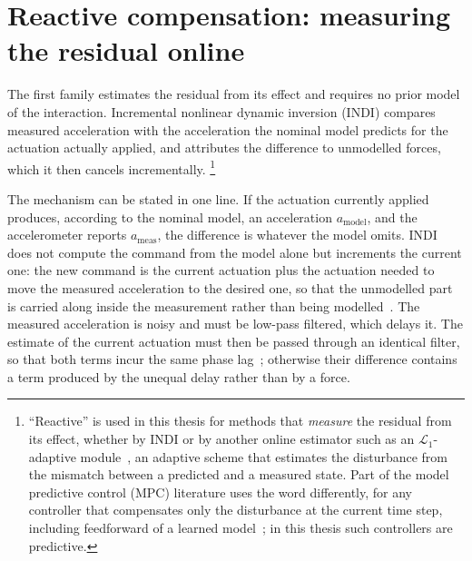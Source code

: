 \section{Reactive compensation: measuring the residual online}
\label{sec:rw-reactive}

The first family estimates the residual from its effect and requires no prior model of the
interaction. Incremental nonlinear dynamic inversion (INDI) compares measured acceleration with the
acceleration the nominal model predicts for the actuation actually applied, and attributes the
difference to unmodelled forces, which it then cancels incrementally.%
\footnote{``Reactive'' is used in this thesis for methods that \emph{measure} the residual from its
effect, whether by INDI or by another online estimator such as an $\mathcal{L}_1$-adaptive
module~\cite{hsieh2025onlineadaptation}, an adaptive scheme that estimates the disturbance from the
mismatch between a predicted and a measured state. Part of the model predictive control (MPC)
literature uses the word differently, for any
controller that compensates only the disturbance at the current time step, including feedforward
of a learned model~\cite{chee2024knodedwmpc}; in this thesis such controllers are predictive.}

The mechanism can be stated in one line. If the actuation currently applied produces, according to
the nominal model, an acceleration $a_{\mathrm{model}}$, and the accelerometer reports
$a_{\mathrm{meas}}$, the difference is whatever the model omits. INDI does not compute the
command from the model alone but increments the current one: the new command is the current
actuation plus the actuation needed to move the measured acceleration to the desired one, so that
the unmodelled part is carried along inside the measurement rather than being
modelled~\cite{tal2018indi,smeur2017cascadedindi}. The measured acceleration is noisy and must be
low-pass filtered, which delays it. The estimate of the current actuation must then be passed
through an identical filter, so that both terms incur the same phase
lag~\cite{tal2018indi,smeur2017cascadedindi}; otherwise their difference contains a term produced by
the unequal delay rather than by a force.

